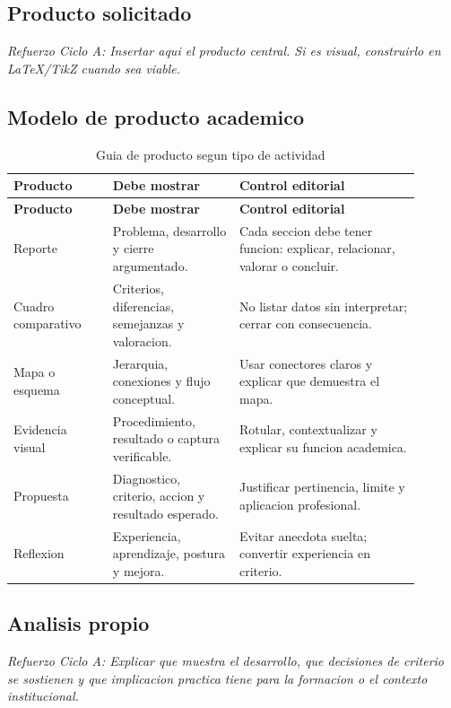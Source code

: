\documentclass[
	spanish,
	letterpaper, oneside
]{article}
\begin{document}
\subsection{Producto solicitado}

\textit{Refuerzo Ciclo A: Insertar aqui el producto central. Si es visual, construirlo en LaTeX/TikZ cuando sea viable.}

\subsection{Modelo de producto academico}

\begin{longtable}{@{}p{0.22\linewidth}p{0.28\linewidth}p{0.40\linewidth}@{}}
	\caption{Guia de producto segun tipo de actividad}\label{tab:producto-academico-itesca}\\
	\toprule
	\textbf{Producto} & \textbf{Debe mostrar} & \textbf{Control editorial} \\
	\midrule
	\endfirsthead
	\toprule
	\textbf{Producto} & \textbf{Debe mostrar} & \textbf{Control editorial} \\
	\midrule
	\endhead
	Reporte & Problema, desarrollo y cierre argumentado. & Cada seccion debe tener funcion: explicar, relacionar, valorar o concluir. \\
	Cuadro comparativo & Criterios, diferencias, semejanzas y valoracion. & No listar datos sin interpretar; cerrar con consecuencia. \\
	Mapa o esquema & Jerarquia, conexiones y flujo conceptual. & Usar conectores claros y explicar que demuestra el mapa. \\
	Evidencia visual & Procedimiento, resultado o captura verificable. & Rotular, contextualizar y explicar su funcion academica. \\
	Propuesta & Diagnostico, criterio, accion y resultado esperado. & Justificar pertinencia, limite y aplicacion profesional. \\
	Reflexion & Experiencia, aprendizaje, postura y mejora. & Evitar anecdota suelta; convertir experiencia en criterio. \\
	\bottomrule
\end{longtable}

\subsection{Analisis propio}

\textit{Refuerzo Ciclo A: Explicar que muestra el desarrollo, que decisiones de criterio se sostienen y que implicacion practica tiene para la formacion o el contexto institucional.}
\end{document}
